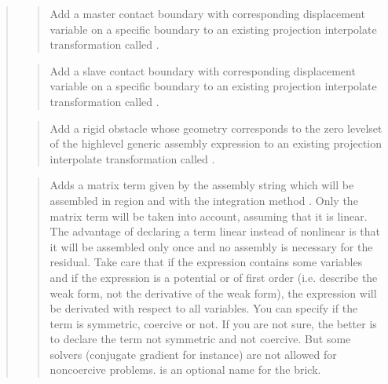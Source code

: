 \documentclass[a4paper,11pt,english]{sphinxmanual}
\begin{document}
\begin{quote}
\begin{quote}
\sphinxAtStartPar
Add a master contact boundary with corresponding displacement variable
 on a specific boundary  to an existing projection
interpolate transformation called .
\end{quote}

\sphinxAtStartPar
{}
\begin{quote}

\sphinxAtStartPar
Add a slave contact boundary with corresponding displacement variable
 on a specific boundary  to an existing projection
interpolate transformation called .
\end{quote}

\sphinxAtStartPar
{}
\begin{quote}

\sphinxAtStartPar
Add a rigid obstacle whose geometry corresponds to the zero level\sphinxhyphen{}set
of the high\sphinxhyphen{}level generic assembly expression 
to an existing projection interpolate transformation called .
\end{quote}

\sphinxAtStartPar
{}
\begin{quote}

\sphinxAtStartPar
Adds a matrix term given by the assembly string  which will
be assembled in region  and with the integration method .
Only the matrix term will be taken into account, assuming that it is
linear.
The advantage of declaring a term linear instead of nonlinear is that
it will be assembled only once and no assembly is necessary for the
residual.
Take care that if the expression contains some variables and if the
expression is a potential or of first order (i.e. describe the weak
form, not the derivative of the weak form), the expression will be
derivated with respect to all variables.
You can specify if the term is symmetric, coercive or not.
If you are not sure, the better is to declare the term not symmetric
and not coercive. But some solvers (conjugate gradient for instance)
are not allowed for non\sphinxhyphen{}coercive problems.
 is an optional name for the brick.
\end{quote}


\end{quote}
\end{document}
